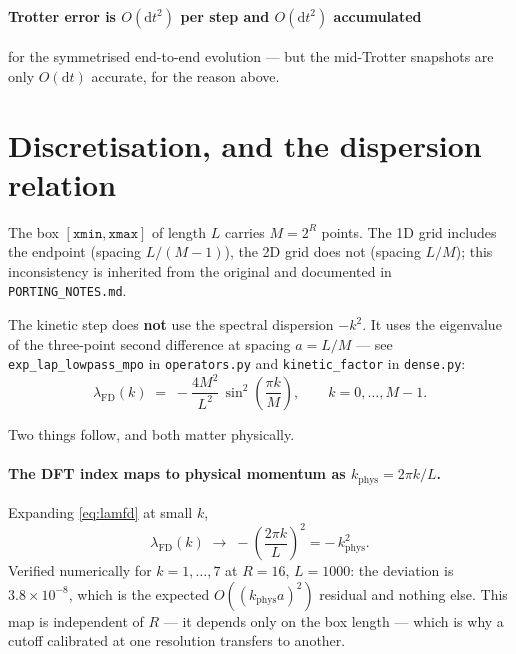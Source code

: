 \documentclass[11pt,a4paper]{article}
\newcommand{\code}[1]{\texttt{#1}}
\newcommand{\kph}{k_{\mathrm{phys}}}
\newcommand{\lFD}{\lambda_{\mathrm{FD}}}
\newcommand{\dd}{\mathrm{d}}
\begin{document}
\paragraph{Trotter error is $O(\dd t^2)$ per step and $O(\dd t^2)$ accumulated}
for the symmetrised end-to-end evolution --- but the mid-Trotter snapshots are only
$O(\dd t)$ accurate, for the reason above.

\section{Discretisation, and the dispersion relation}
\label{sec:dispersion}

The box $[\code{xmin}, \code{xmax}]$ of length $L$ carries $M = 2^R$ points. The 1D
grid includes the endpoint (spacing $L/(M-1)$), the 2D grid does not (spacing $L/M$);
this inconsistency is inherited from the original and documented in
\code{PORTING\_NOTES.md}.

The kinetic step does \textbf{not} use the spectral dispersion $-k^2$. It uses the
eigenvalue of the three-point second difference at spacing $a = L/M$ --- see
\code{exp\_lap\_lowpass\_mpo} in \code{operators.py} and \code{kinetic\_factor}
in \code{dense.py}:
\begin{equation}
  \lFD(k) \;=\; -\frac{4M^2}{L^2}\,\sin^2\!\left(\frac{\pi k}{M}\right),
  \qquad k = 0,\dots,M-1 .
  \label{eq:lamfd}
\end{equation}

Two things follow, and both matter physically.

\paragraph{The DFT index maps to physical momentum as $\kph = 2\pi k / L$.}
Expanding \eqref{eq:lamfd} at small $k$,
\begin{equation}
  \lFD(k) \;\longrightarrow\; -\left(\frac{2\pi k}{L}\right)^{\!2} = -\,\kph^2 .
\end{equation}
Verified numerically for $k = 1,\dots,7$ at $R = 16$, $L = 1000$: the deviation is
$3.8\times 10^{-8}$, which is the expected $O\!\left((\kph a)^2\right)$ residual and
nothing else. This map is independent of $R$ --- it depends only on the box length
--- which is why a cutoff calibrated at one resolution transfers to another.
\end{document}
